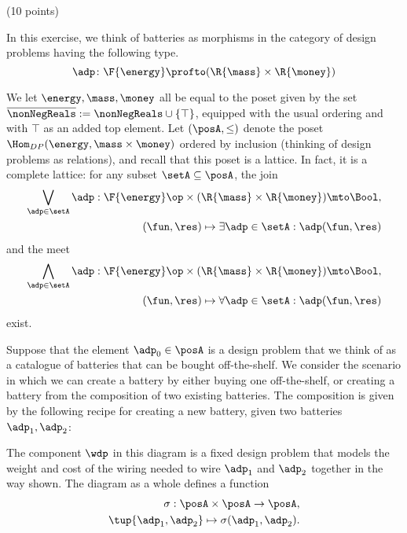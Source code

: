 \documentclass[paper=8.125in:10.250in,pagesize=pdftex,
    headinclude=false,footinclude=false,oneside,egregdoesnotlikesansseriftitles]{kaobook}
\begin{document}

\newpage


\begin{gradedexercise}\label{ex:BatteryDP} (10 points)

In this exercise, we think of batteries as morphisms in the category of design problems having the following type.
    \begin{equation}
        \adp \colon \F{\energy}\profto (\R{\mass}\times \R{\money})
    \end{equation}
    \begin{center}
    \end{center}
We let $\energy,\mass,\money$ all be equal to the poset given by the set $\overline{\nonNegReals} := \nonNegReals \cup \{\top\}$, equipped with the usual ordering and with $\top$ as an added top element. Let $(\posA, \leq)$ denote the poset $\Hom_{DP}(\energy, \mass \times \money)$ ordered by inclusion (thinking of design problems as relations), and recall that this poset is a lattice. In fact, it is a complete lattice: for any subset $\setA \subseteq \posA$, the join
\begin{eqnarray}
\bigvee_{\adp \in \setA} \adp : \F{\energy}\op \times (\R{\mass}\times \R{\money}) \mto \Bool, \\
(\fun, \res) \mapsto \exists \adp \in \setA : \adp(\fun, \res)
\end{eqnarray}
and the meet
\begin{eqnarray}
\bigwedge_{\adp \in \setA} \adp : \F{\energy}\op \times (\R{\mass}\times \R{\money}) \mto \Bool,\\ (\fun, \res) \mapsto \forall \adp \in \setA : \adp(\fun, \res)
\end{eqnarray}
exist.  

Suppose that the element $\adp_0 \in \posA$ is a design problem that we think of as a catalogue 
of batteries that can be bought off-the-shelf. We consider the scenario in which we can create a battery by either buying one off-the-shelf, or creating a battery from the composition of two existing batteries. The composition is given by the following recipe for creating a new battery, given two batteries~$\adp_1,\adp_2$:
    \begin{center}
    \end{center}
The component $\wdp$ in this diagram is a fixed design problem that models the weight and cost of the wiring needed to wire $\adp_1$ and $\adp_2$ together in the way shown. The diagram as a whole defines a function 
\begin{eqnarray}
\sigma: \posA \times \posA \to \posA,\\ \tup{\adp_1,\adp_2} \mapsto \sigma(\adp_1,\adp_2).
\end{eqnarray}


\end{gradedexercise}
\end{document}
